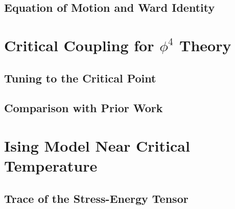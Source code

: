 

\subsection{Equation of Motion and Ward Identity}






\section{Critical Coupling for $\phi^4$ Theory}
\label{sec:Coupling}



\subsection{Tuning to the Critical Point}





\subsection{Comparison with Prior Work}
\label{subsec:compare}






\section{Ising Model Near Critical Temperature}
\label{sec:Ising}




\subsection{Trace of the Stress-Energy Tensor}
\label{subsec:stress}


